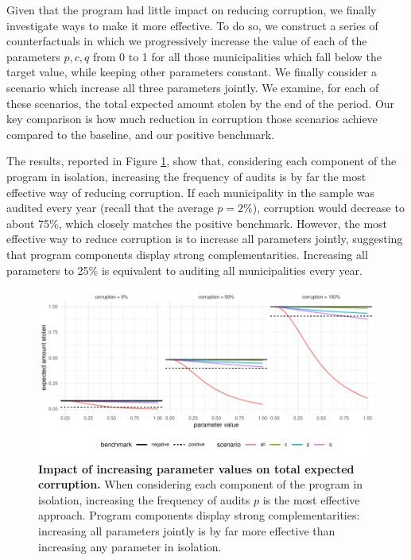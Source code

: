 \documentclass[12pt,a4paper]{article}
\theoremstyle{definition}
\begin{document}
{Given that the program had little impact on reducing corruption, we finally investigate ways to make it more effective. To do so, we construct a series of counterfactuals in which we progressively increase the value of each of the parameters $p, c, q$ from 0 to 1 for all those municipalities which fall below the target value, while keeping other parameters constant. We finally consider a scenario which increase all three parameters jointly. We examine, for each of these scenarios, the total expected amount stolen by the end of the period. Our key comparison is how much reduction in corruption those scenarios achieve compared to the baseline, and our positive benchmark. 

The results, reported in Figure \ref{fig:counterfactuals2}, show that, considering each component of the program in isolation, increasing the frequency of audits is by far the most effective way of reducing corruption. If each municipality in the sample was audited every year (recall that the average $p = 2\%$), corruption would decrease to about 75\%, which closely matches the positive benchmark. However, the most effective way to reduce corruption is to increase all parameters jointly, suggesting that program components display strong complementarities. Increasing all parameters to 25\% is equivalent to auditing all municipalities every year. 

\begin{figure}[H]
    \centering
    \includegraphics{figures/counterfactuals_effectiveness.pdf}
    \caption{{\bf Impact of increasing parameter values on total expected corruption.} When considering each component of the program in isolation, increasing the frequency of audits $p$ is the most effective approach. Program components display strong complementarities: increasing all parameters jointly is by far more effective than increasing any parameter in isolation.}
    \label{fig:counterfactuals2}
\end{figure}

}
\end{document}

